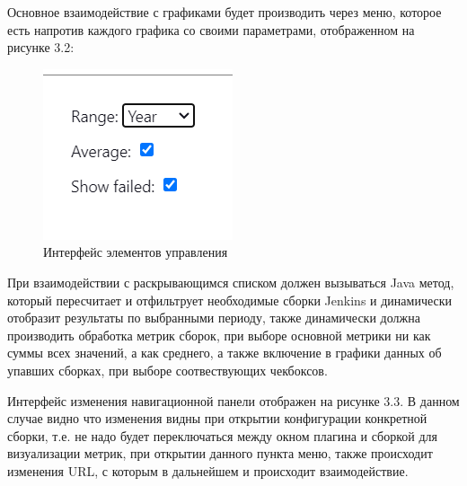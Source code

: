 Основное взаимодействие с графиками будет производить через меню, которое есть напротив каждого графика со своими параметрами, отображенном на рисунке 3.2:

\begin{figure}[ht!] 
	\center
	\includegraphics [scale=0.47] {my_folder/images//ui2}
	\caption{Интерфейс элементов управления} 
	\label{fig:ArchitectureJenkins}  
\end{figure}

При взаимодействии с раскрывающимся списком должен вызываться Java метод, который пересчитает и отфильтрует необходимые сборки Jenkins и динамически отобразит результаты по выбранными периоду, также динамически должна производить обработка метрик сборок, при выборе основной метрики ни как суммы всех значений, а как среднего, а также включение в графики данных об упавших сборках, при выборе соотвествующих чекбоксов.

Интерфейс изменения навигационной панели отображен на рисунке 3.3. В данном случае видно что изменения видны при открытии конфигурации конкретной сборки, т.е. не надо будет переключаться между окном плагина и сборкой для визуализации метрик, при открытии данного пункта меню, также происходит изменения URL, с которым в дальнейшем и происходит взаимодействие.


